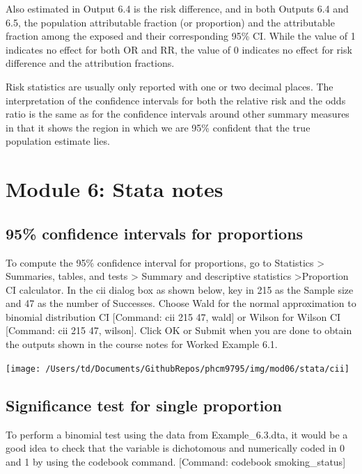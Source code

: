 \documentclass[
]{memoir}
\begin{document}
Also estimated in Output 6.4 is the risk difference, and in both Outputs 6.4 and 6.5, the population attributable fraction (or proportion) and the attributable fraction among the exposed and their corresponding 95\% CI. While the value of 1 indicates no effect for both OR and RR, the value of 0 indicates no effect for risk difference and the attribution fractions.

Risk statistics are usually only reported with one or two decimal places. The interpretation of the confidence intervals for both the relative risk and the odds ratio is the same as for the confidence intervals around other summary measures in that it shows the region in which we are 95\% confident that the true population estimate lies.

\hypertarget{module-6-stata-notes}{%
\chapter*{Module 6: Stata notes}\label{module-6-stata-notes}}

\hypertarget{confidence-intervals-for-proportions}{%
\section{95\% confidence intervals for proportions}\label{confidence-intervals-for-proportions}}

To compute the 95\% confidence interval for proportions, go to Statistics \textgreater{} Summaries, tables, and tests \textgreater{} Summary and descriptive statistics \textgreater Proportion CI calculator. In the cii dialog box as shown below, key in 215 as the Sample size and 47 as the number of Successes. Choose Wald for the normal approximation to binomial distribution CI {[}Command: cii 215 47, wald{]} or Wilson for Wilson CI {[}Command: cii 215 47, wilson{]}. Click OK or Submit when you are done to obtain the outputs shown in the course notes for Worked Example 6.1.

\texttt{[image: /Users/td/Documents/GithubRepos/phcm9795/img/mod06/stata/cii]}

\hypertarget{significance-test-for-single-proportion}{%
\section{Significance test for single proportion}\label{significance-test-for-single-proportion}}

To perform a binomial test using the data from Example\_6.3.dta, it would be a good idea to check that the variable is dichotomous and numerically coded in 0 and 1 by using the codebook command. {[}Command: codebook smoking\_status{]}
\end{document}
